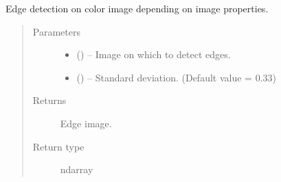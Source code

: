 \documentclass[letterpaper,10pt,english]{sphinxmanual}
\begin{document}

\begin{fulllineitems}
\label{\detokenize{image_helpers:image_helpers.statistic_canny}}
Edge detection on color image depending on image properties.
\begin{quote}\begin{description}
\item[{Parameters}] \leavevmode\begin{itemize}
\item {} 
 () -- Image on which to detect edges.

\item {} 
 () -- Standard deviation. (Default value = 0.33)

\end{itemize}

\item[{Returns}] \leavevmode
Edge image.

\item[{Return type}] \leavevmode
ndarray

\end{description}\end{quote}

\end{fulllineitems}

\end{document}
